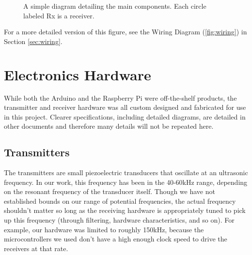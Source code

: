 \documentclass[12pt]{article}
\begin{document}
\begin{figure}[h]
\begin{center}
\end{center}
\caption{A simple diagram detailing the main components.
	Each circle labeled Rx is a receiver.}
\label{fig:component-diagram}
\end{figure}

For a more detailed version of this figure, see the
Wiring Diagram (\ref{fig:wiring}) in Section \ref{sec:wiring}.

\section{Electronics Hardware}\label{sec:ee-hardware}

While both the Arduino and the Raspberry Pi were off-the-shelf products,
the transmitter and receiver hardware was all custom designed and fabricated
for use in this project.
Clearer specifications, including detailed diagrams, are detailed in other
documents and therefore many details will not be repeated here.

\subsection{Transmitters}

The transmitters are small piezoelectric transducers that oscillate at an
ultrasonic frequency.
In our work, this frequency has been in the 40-60kHz range, depending on the
resonant frequency of the transducer itself.
Though we have not established bounds on our range of potential frequencies,
the actual frequency shouldn't matter so long as the receiving hardware is
appropriately tuned to pick up this frequency (through filtering,
hardware characteristics, and so on).
For example, our hardware was limited to roughly 150kHz, because the
microcontrollers we used don't have a high enough clock speed to drive
the receivers at that rate.
\end{document}
